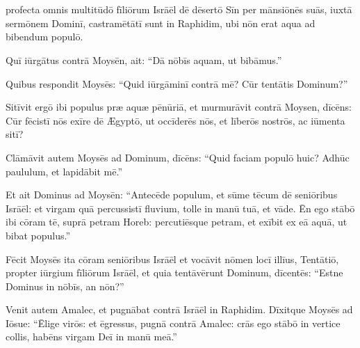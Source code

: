 \chapter{}


\thispagestyle{empty}


 profecta omnis multitūdō fīliōrum Isrāēl dē
dēsertō Sīn per mānsiōnēs suās, iuxtā sermōnem Dominī,
castramētātī sunt in Raphidim, ubi nōn
erat aqua ad bibendum populō. 

Quī iūrgātus contrā
Moysēn, ait: ``Dā nōbīs aquam, ut bibāmus.''

Quibus respondit Moysēs: ``Quid iūrgāminī contrā mē? Cūr
tentātis Dominum?''

Sitīvit ergō ibi populus præ aquæ pēnūriā, et
murmurāvit contrā Moysen,
dīcēns: Cūr fēcistī nōs exīre dē Ægyptō, ut occīderēs nōs, et līberōs
nostrōs, ac iūmenta sitī? 

Clāmāvit autem Moysēs ad
Dominum, dīcēns: ``Quid faciam populō huic? Adhūc paululum,
et lapidābit mē.''

Et ait Dominus ad Moysēn:
``Antecēde populum, et sūme tēcum dē seniōribus Isrāēl: et
virgam quā percussistī fluvium, tolle in manū tuā, et vāde. 
Ēn ego stābō ibi cōram tē, suprā petram
Horeb: percutiēsque petram, et exībit ex eā aquā, ut bibat
populus.''

Fēcit Moysēs ita cōram seniōribus Isrāēl 
et vocāvit nōmen locī
illīus, Tentātiō, propter iūrgium fīliōrum
Isrāēl, et quia tentāvērunt Dominum, dīcentēs: ``Estne Dominus in nōbīs, an
nōn?''

Venit autem Amalec, et pugnābat contrā Isrāēl in Raphidim.
Dīxitque Moysēs ad Iōsue: ``Ēlige virōs: et ēgressus, pugnā contrā Amalec:
crās ego stābō in vertice collis, habēns virgam Deī in manū
meā.''

